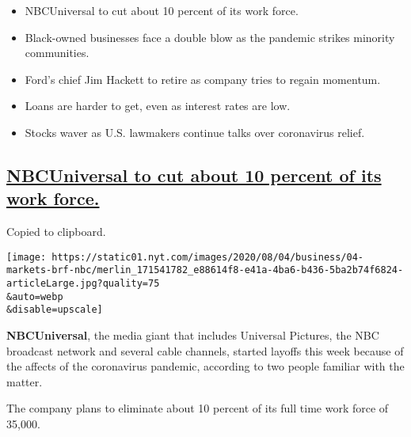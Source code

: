 \begin{itemize}
\item
  \protect\hyperlink{nbcuniversal-to-cut-about-10-percent-of-its-work-force}{}

  NBCUniversal to cut about 10 percent of its work force.
\item
  \protect\hyperlink{black-owned-businesses-face-a-double-blow-as-the-pandemic-strikes-minority-communities}{}

  Black-owned businesses face a double blow as the pandemic strikes
  minority communities.
\item
  \protect\hyperlink{fords-chief-jim-hackett-to-retire-as-company-tries-to-regain-momentum}{}

  Ford's chief Jim Hackett to retire as company tries to regain
  momentum.
\item
  \protect\hyperlink{loans-are-harder-to-get-even-as-interest-rates-are-low}{}

  Loans are harder to get, even as interest rates are low.
\item
  \protect\hyperlink{stocks-waver-as-us-lawmakers-continue-talks-over-coronavirus-relief}{}

  Stocks waver as U.S. lawmakers continue talks over coronavirus relief.
\end{itemize}

\hypertarget{nbcuniversal-to-cut-about-10-percent-of-its-work-force}{%
\subsection{\texorpdfstring{\protect\hyperlink{nbcuniversal-to-cut-about-10-percent-of-its-work-force}{NBCUniversal
to cut about 10 percent of its work
force.}}{NBCUniversal to cut about 10 percent of its work force.}}\label{nbcuniversal-to-cut-about-10-percent-of-its-work-force}}

Copied to clipboard.

\texttt{[image: https://static01.nyt.com/images/2020/08/04/business/04-markets-brf-nbc/merlin\_171541782\_e88614f8-e41a-4ba6-b436-5ba2b74f6824-articleLarge.jpg?quality=75\\\&auto=webp\\\&disable=upscale]}

\textbf{NBCUniversal}, the media giant that includes Universal Pictures,
the NBC broadcast network and several cable channels, started layoffs
this week because of the affects of the coronavirus pandemic, according
to two people familiar with the matter.

The company plans to eliminate about 10 percent of its full time work
force of 35,000.

